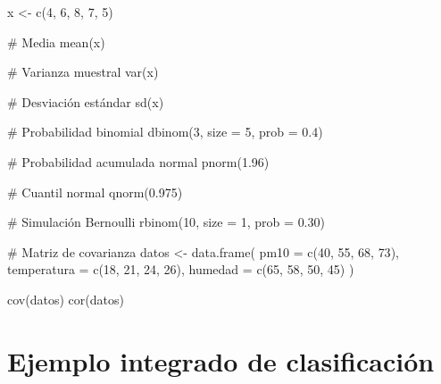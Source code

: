 \documentclass[
  spanish,
  10.5pt,
  letterpaper,
  DIV=11,
  numbers=noendperiod,
  oneside,
  open=any]{scrreprt}
\newenvironment{Shaded}{\begin{snugshade}}{\end{snugshade}}
\newcommand{\AttributeTok}[1]{\textcolor[rgb]{0.40,0.45,0.13}{#1}}
\newcommand{\CommentTok}[1]{\textcolor[rgb]{0.37,0.37,0.37}{#1}}
\newcommand{\DecValTok}[1]{\textcolor[rgb]{0.68,0.00,0.00}{#1}}
\newcommand{\FloatTok}[1]{\textcolor[rgb]{0.68,0.00,0.00}{#1}}
\newcommand{\FunctionTok}[1]{\textcolor[rgb]{0.28,0.35,0.67}{#1}}
\newcommand{\NormalTok}[1]{\textcolor[rgb]{0.00,0.23,0.31}{#1}}
\newcommand{\OtherTok}[1]{\textcolor[rgb]{0.00,0.23,0.31}{#1}}
\theoremstyle{definition}
\theoremstyle{definition}
\theoremstyle{plain}
\theoremstyle{remark}
\begin{document}
\begin{Shaded}
\begin{Highlighting}[numbers=left,,]
\NormalTok{x }\OtherTok{\textless{}{-}} \FunctionTok{c}\NormalTok{(}\DecValTok{4}\NormalTok{, }\DecValTok{6}\NormalTok{, }\DecValTok{8}\NormalTok{, }\DecValTok{7}\NormalTok{, }\DecValTok{5}\NormalTok{)}

\CommentTok{\# Media}
\FunctionTok{mean}\NormalTok{(x)}

\CommentTok{\# Varianza muestral}
\FunctionTok{var}\NormalTok{(x)}

\CommentTok{\# Desviación estándar}
\FunctionTok{sd}\NormalTok{(x)}

\CommentTok{\# Probabilidad binomial}
\FunctionTok{dbinom}\NormalTok{(}\DecValTok{3}\NormalTok{, }\AttributeTok{size =} \DecValTok{5}\NormalTok{, }\AttributeTok{prob =} \FloatTok{0.4}\NormalTok{)}

\CommentTok{\# Probabilidad acumulada normal}
\FunctionTok{pnorm}\NormalTok{(}\FloatTok{1.96}\NormalTok{)}

\CommentTok{\# Cuantil normal}
\FunctionTok{qnorm}\NormalTok{(}\FloatTok{0.975}\NormalTok{)}

\CommentTok{\# Simulación Bernoulli}
\FunctionTok{rbinom}\NormalTok{(}\DecValTok{10}\NormalTok{, }\AttributeTok{size =} \DecValTok{1}\NormalTok{, }\AttributeTok{prob =} \FloatTok{0.30}\NormalTok{)}

\CommentTok{\# Matriz de covarianza}
\NormalTok{datos }\OtherTok{\textless{}{-}} \FunctionTok{data.frame}\NormalTok{(}
  \AttributeTok{pm10 =} \FunctionTok{c}\NormalTok{(}\DecValTok{40}\NormalTok{, }\DecValTok{55}\NormalTok{, }\DecValTok{68}\NormalTok{, }\DecValTok{73}\NormalTok{),}
  \AttributeTok{temperatura =} \FunctionTok{c}\NormalTok{(}\DecValTok{18}\NormalTok{, }\DecValTok{21}\NormalTok{, }\DecValTok{24}\NormalTok{, }\DecValTok{26}\NormalTok{),}
  \AttributeTok{humedad =} \FunctionTok{c}\NormalTok{(}\DecValTok{65}\NormalTok{, }\DecValTok{58}\NormalTok{, }\DecValTok{50}\NormalTok{, }\DecValTok{45}\NormalTok{)}
\NormalTok{)}

\FunctionTok{cov}\NormalTok{(datos)}
\FunctionTok{cor}\NormalTok{(datos)}
\end{Highlighting}
\end{Shaded}

\section*{Ejemplo integrado de
clasificación}\label{ejemplo-integrado-de-clasificaciuxf3n}
\end{document}
